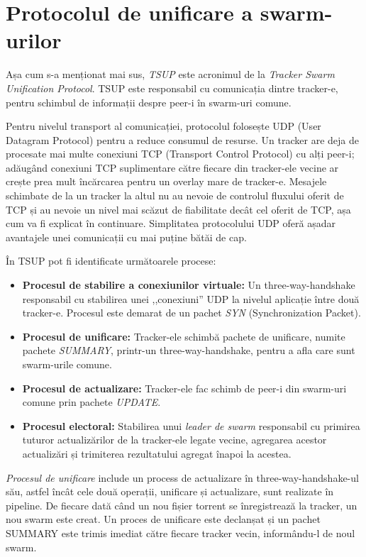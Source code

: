 \section{Protocolul de unificare a swarm-urilor}
\label{sec:unified-tracker:swarm-unification}

Așa cum s-a menționat mai sus, \textit{TSUP} este acronimul de la \textit{Tracker Swarm Unification Protocol}. TSUP este responsabil cu comunicația dintre tracker-e, pentru schimbul de informații despre peer-i în swarm-uri comune.

Pentru nivelul transport al comunicației, protocolul folosește UDP (User
Datagram Protocol) pentru a reduce consumul de resurse. Un tracker are deja de
procesate mai multe conexiuni TCP (Transport Control Protocol) cu alți peer-i; adăugând conexiuni TCP suplimentare către fiecare din tracker-ele vecine ar crește prea mult încărcarea pentru un overlay mare de tracker-e. Mesajele schimbate de la un tracker la altul nu au nevoie de controlul fluxului oferit de TCP și au nevoie un nivel mai scăzut de fiabilitate decât cel oferit de TCP, așa cum va fi explicat în continuare. Simplitatea protocolului UDP oferă așadar avantajele unei comunicații cu mai puține bătăi de cap.

În TSUP pot fi identificate următoarele procese:
\begin{itemize}
    \item \textbf{Procesul de stabilire a conexiunilor virtuale:} Un
    three-way-handshake responsabil cu stabilirea unei ,,conexiuni'' UDP la nivelul aplicație între două tracker-e. Procesul este demarat de un pachet \textit{SYN} (Synchronization Packet).
    \item \textbf{Procesul de unificare:} Tracker-ele schimbă pachete de
    unificare, numite pachete \textit{SUMMARY}, printr-un three-way-handshake, pentru a afla care sunt swarm-urile comune.
    \item \textbf{Procesul de actualizare:} Tracker-ele fac schimb de peer-i din swarm-uri comune prin pachete \textit{UPDATE}.
    \item \textbf{Procesul electoral:} Stabilirea unui \textit{leader de swarm} responsabil cu primirea tuturor actualizărilor de la tracker-ele legate vecine, agregarea acestor actualizări și trimiterea rezultatului agregat înapoi la acestea.
\end{itemize}

\textit{Procesul de unificare} include un process de actualizare în three-way-handshake-ul său, astfel încât cele două operații, unificare și actualizare, sunt realizate în pipeline. De fiecare dată când un nou fișier torrent se înregistrează la tracker, un nou swarm este creat. Un proces de unificare este declanșat și un pachet SUMMARY este trimis imediat către fiecare tracker vecin, informându-l de noul swarm.

